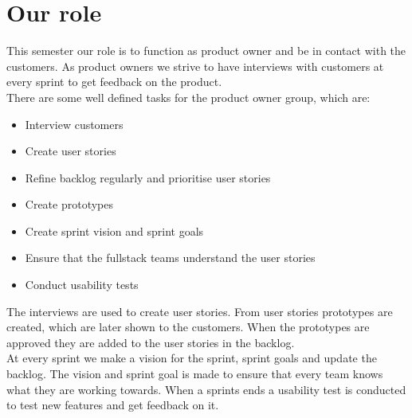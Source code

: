 \section{Our role}
This semester our role is to function as product owner and be in contact with the customers.
As product owners we strive to have interviews with customers at every sprint to get feedback on the product.
\\
There are some well defined tasks for the product owner group, which are:
\begin{itemize}
    \item Interview customers
    \item Create user stories    
    \item Refine backlog regularly and prioritise user stories
    \item Create prototypes
    \item Create sprint vision and sprint goals
    \item Ensure that the fullstack teams understand the user stories
    \item Conduct usability tests
\end{itemize}
\noindent
The interviews are used to create user stories. 
From user stories prototypes are created, which are later shown to the customers.
When the prototypes are approved they are added to the user stories in the backlog.
\\
At every sprint we make a vision for the sprint, sprint goals and update the backlog. 
The vision and sprint goal is made to ensure that every team knows what they are working towards.
When a sprints ends a usability test is conducted to test new features and get feedback on it.

